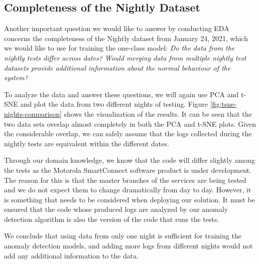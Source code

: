 \subsection{Completeness of the Nightly Dataset}
\label{assumption-completeness}

Another important question we would like to answer by conducting EDA concerns the completeness of the Nightly dataset from January 24, 2021, which we would like to use for training the one-class model: \textit{Do the data from the nightly tests differ across dates?} \textit{Would merging data from multiple nightly test datasets provide additional information about the normal behaviour of the system?}

To analyze the data and answer these questions, we will again use PCA and t-SNE and plot the data from two different nights of testing. Figure \ref{fig:tsne-nights-comparison} shows the visualization of the results. It can be seen that the two data sets overlap almost completely in both the PCA and t-SNE plots. Given the considerable overlap, we can safely assume that the logs collected during the nightly tests are equivalent within the different dates.

Through our domain knowledge, we know that the code will differ slightly among the tests as the Motorola SmartConnect software product is under development. The reason for this is that the master branches of the services are being tested and we do not expect them to change dramatically from day to day. 
However, it is something that needs to be considered when deploying our solution. It must be ensured that the code whose produced logs are analyzed by our anomaly detection algorithm is also the version of the code that runs the tests.

We conclude that using data from only one night is sufficient for training the anomaly detection models, and adding more logs from different nights would not add any additional information to the data. 

